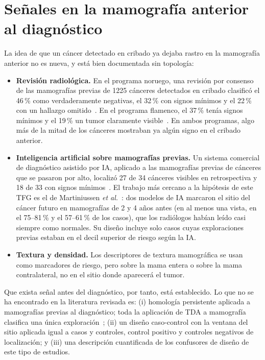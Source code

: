 \section{Señales en la mamografía anterior al diagnóstico}
\label{sec:estado-arte-previa}
La idea de que un cáncer detectado en cribado ya dejaba rastro en la
mamografía anterior no es nueva, y está bien documentada sin topología:

\begin{itemize}
  \item \textbf{Revisión radiológica.} En el programa noruego, una revisión
        por consenso de las mamografías previas de 1225 cánceres detectados
        en cribado clasificó el 46\,\% como verdaderamente negativas, el
        32\,\% con signos mínimos y el 22\,\% con un hallazgo
        omitido~\cite{hovda2021prior}. En el programa flamenco, el 37\,\%
        tenía signos mínimos y el 19\,{}\% un tumor claramente visible~\cite{vandendaele2022review}.
        En ambos programas, algo más de la mitad de los cánceres mostraban
        ya algún signo en el cribado anterior.
  \item \textbf{Inteligencia artificial sobre mamografías previas.}
        Un sistema comercial de diagnóstico asistido por IA, aplicado a las
        mamografías previas de cánceres que se pasaron por alto, localizó 27
        de 34 cánceres visibles en retrospectiva y 18 de 33 con signos
        mínimos~\cite{park2022missed}. El trabajo más cercano a la hipótesis
        de este TFG es el de Martiniussen \textit{et
        al.}~\cite{martiniussen2026aimarkers}: dos modelos de IA marcaron el
        sitio del cáncer futuro en mamografías de 2 y 4 años antes (en al
        menos una vista, en el 75--81\,\% y el 57--61\,\% de los casos), que
        los radiólogos habían leído casi siempre como normales. Su diseño
        incluye solo casos cuyas exploraciones previas estaban en el decil
        superior de riesgo según la IA.
  \item \textbf{Textura y densidad.} Los descriptores de textura
        mamográfica se usan como marcadores de riesgo, pero sobre la mama
        entera o sobre la mama contralateral, no en el sitio donde aparecerá
        el tumor.
\end{itemize}

Que exista señal antes del diagnóstico, por tanto, está establecido. Lo que
no se ha encontrado en la literatura revisada es: (i) homología persistente
aplicada a mamografías previas al diagnóstico; toda la aplicación de TDA a
mamografía clasifica una única exploración~\cite{malek2023microcalc,
asaad2022phbreast, jetomo2025phca}; (ii) un diseño caso-control con la
ventana del sitio aplicada igual a casos y controles, control positivo y
controles negativos de localización; y (iii) una descripción cuantificada de
los confusores de diseño de este tipo de estudios.

